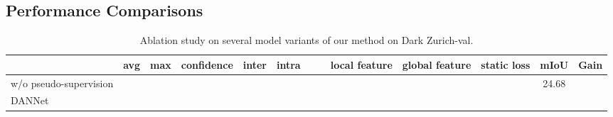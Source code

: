 \documentclass[10pt,twocolumn,letterpaper]{article}
\begin{document}
\subsection{Performance Comparisons}

\begin{table*}[htb]
\centering
\renewcommand{\tabcolsep}{0.65mm}
\renewcommand{\arraystretch}{.9} 
\caption{Ablation study on several model variants of our method on Dark Zurich-val.}
\label{table:ablation}
\begin{tabular}{l|ccc|cc|cc|cc|c|cc}
\hline
                                    &avg & max&confidence&inter & intra   &     &     & local feature     & global feature    &static loss & mIoU    &Gain \\
\hline       
w/o pseudo-supervision               &&&                   &     &                 &               &               &                   &                   &            & 24.68\\
\hline
DANNet


\end{tabular}
\end{table*}
\end{document}
